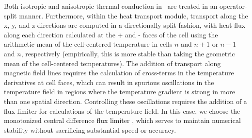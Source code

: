 Both isotropic and anisotropic thermal conduction in \enzo\ are treated
in an operator-split manner.  Furthermore, within the heat transport
module, transport along the x, y, and z directions are computed in a
directionally-split fashion, with heat flux along each direction
calculated at the + and - faces of the cell using the arithmetic mean
of the cell-centered temperature in cells $n$ and $n+1$ or $n-1$ and
$n$, respectively (empirically, this is more stable than taking the
geometric mean of the cell-centered temperatures).  The addition of
transport along magnetic field lines requires the calculation of
cross-terms in the temperature derivatives at cell faces, which can
result in spurious oscillations in the temperature field in regions
where the temperature gradient is strong in more than one spatial
direction.  Controlling these oscillations requires the addition of a
flux limiter for calculations of the temperature field.  In this case,
we choose the monotonized central difference flux limiter
\citep{1977JCoPh..23..263V}, which serves to maintain numerical
stability without sacrificing substantial speed or accuracy.
